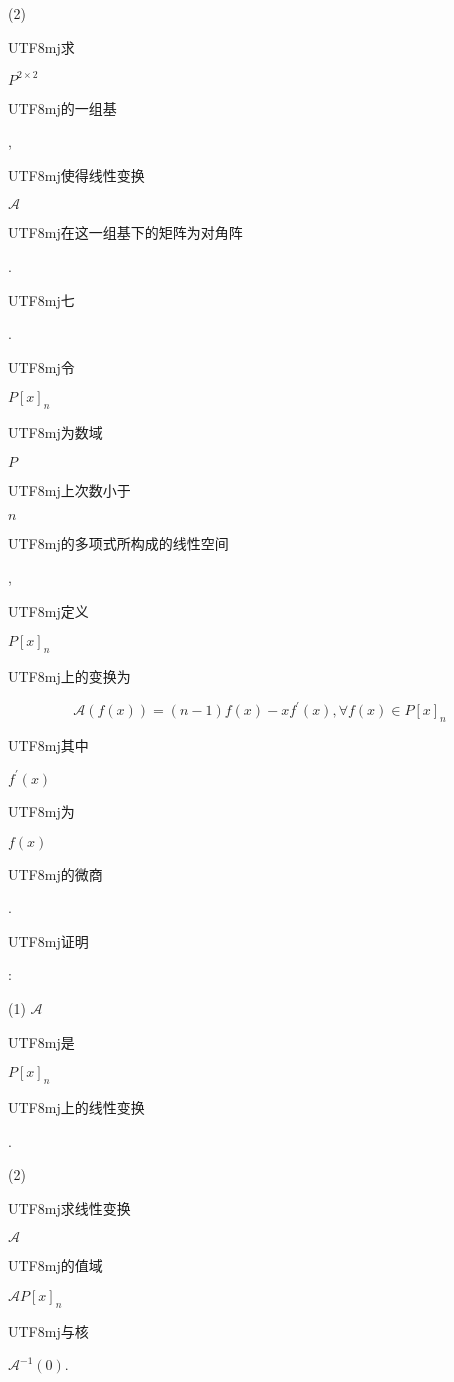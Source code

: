 \documentclass[10pt]{article}
\begin{document}
(2) \begin{CJK}{UTF8}{mj}求\end{CJK} $P^{2 \times 2}$ \begin{CJK}{UTF8}{mj}的一组基\end{CJK}, \begin{CJK}{UTF8}{mj}使得线性变换\end{CJK} $\mathscr{A}$ \begin{CJK}{UTF8}{mj}在这一组基下的矩阵为对角阵\end{CJK}. \begin{CJK}{UTF8}{mj}七\end{CJK}. \begin{CJK}{UTF8}{mj}令\end{CJK} $P[x]_{n}$ \begin{CJK}{UTF8}{mj}为数域\end{CJK} $P$ \begin{CJK}{UTF8}{mj}上次数小于\end{CJK} $n$ \begin{CJK}{UTF8}{mj}的多项式所构成的线性空间\end{CJK}, \begin{CJK}{UTF8}{mj}定义\end{CJK} $P[x]_{n}$ \begin{CJK}{UTF8}{mj}上的变换为\end{CJK}
$$
\mathscr{A}(f(x))=(n-1) f(x)-x f^{\prime}(x), \forall f(x) \in P[x]_{n}
$$
\begin{CJK}{UTF8}{mj}其中\end{CJK} $f^{\prime}(x)$ \begin{CJK}{UTF8}{mj}为\end{CJK} $f(x)$ \begin{CJK}{UTF8}{mj}的微商\end{CJK}. \begin{CJK}{UTF8}{mj}证明\end{CJK}:

(1) $\mathscr{A}$ \begin{CJK}{UTF8}{mj}是\end{CJK} $P[x]_{n}$ \begin{CJK}{UTF8}{mj}上的线性变换\end{CJK}.

(2) \begin{CJK}{UTF8}{mj}求线性变换\end{CJK} $\mathscr{A}$ \begin{CJK}{UTF8}{mj}的值域\end{CJK} $\mathscr{A} P[x]_{n}$ \begin{CJK}{UTF8}{mj}与核\end{CJK} $\mathscr{A}^{-1}(0)$.
\end{document}
